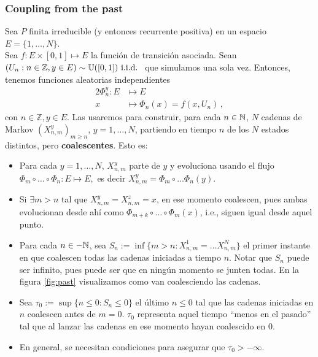 \subsubsection{Coupling from the past}
Sea $P$ finita irreducible (y entonces recurrente positiva) en un espacio $E=\{1,\dots,N\}$. \\ Sea $f:E\times[0,1]\mapsto E$ la función de transición asociada. Sean $(U_n:n\in\mathbb{Z},y\in E)\sim\mathbb{U}([0,1])\mbox{ i.i.d. }$ que simulamos una sola vez.
Entonces, tenemos funciones aleatorias independientes
\begin{alignat*}{2}
\Phi_n^y:E & \longmapsto E \\
x & \longmapsto \Phi_n(x) = f(x,U_n)\, ,
\end{alignat*}
con $n\in\mathbb{Z}, y\in E$. Las usaremos para construir, para cada $n\in\mathbb{N}$, $N$ cadenas de Markov $(X_{n,m}^y)_{m\geq n}$, $y=1,\dots,N$, partiendo en tiempo $n$ de los $N$ estados distintos, pero \textbf{coalescentes}. Esto es:
\begin{itemize}
    \item Para cada $y=1,\dots,N$, $X^y_{n,m}$ parte de $y$ y evoluciona usando el flujo $\Phi_m\circ\dots\circ\Phi_n:E\longmapsto E,$ es decir $X^y_{n,m}=\Phi_m\circ\dots\Phi_n(y)$.
    \item Si $\exists m>n$ tal que $X^y_{n,m}=X^z_{n,m}=x$, en ese momento coalescen, pues ambas evolucionan desde ahí como $\Phi_{m+k}\circ\dots\circ\Phi_m(x)$, i.e., siguen igual desde aquel punto.
    \item Para cada $n\in-\mathbb{N}$, sea $S_n:=\inf\{m>n:X^1_{n,m}=\dots X^N_{n,m}\}$ el primer instante en que coalescen todas las cadenas iniciadas a tiempo $n$. Notar que $S_n$ puede ser infinito, pues puede ser que en ningún momento se junten todas. En la figura \ref{fig:past} visualizamos como van coalesciendo las cadenas.
    \item Sea $\tau_0:=\sup\{n\leq 0:S_n\leq 0\}$ el último $n\leq 0$ tal que las cadenas iniciadas en $n$ coalescen antes de $m=0$. $\tau_0$ representa aquel tiempo ``menos en el pasado'' tal que al lanzar las cadenas en ese momento hayan coalescido en $0$.
    \item En general, se necesitan condiciones para asegurar que $\tau_0>-\infty$.  %
\end{itemize}

